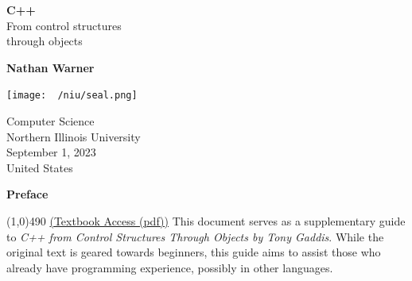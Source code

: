 \documentclass{report}
\title{\Huge{}}
\author{\huge{Nathan Warner}}
\date{\huge{}}
\begin{document}
        \begin{titlepage}
       \begin{center}
           \vspace*{1cm}
    
           \textbf{C++} \\
           From control structures  \\ through objects
    
           \vspace{0.5cm}
            
                
           \vspace{1.5cm}
    
           \textbf{Nathan Warner}
    
           \vfill
                
                
           \vspace{0.8cm}
         
           \texttt{[image: ~/niu/seal.png]}
                
           Computer Science \\
           Northern Illinois University\\
           September 1, 2023 \\
           United States\\
           
                
       \end{center}
    \end{titlepage}
    \tableofcontents
    \pagebreak \bigbreak \noindent
    \begin{center}
        \begin{Huge}
           \textbf{Preface} 
        \end{Huge}
    \end{center}
    \bigbreak \noindent 
    \line(1,0){490}
    \bigbreak \noindent 
    \href{https://github.com/JiaRuiShao/CPP/blob/master/Starting%20Out%20with%20C%2B%2B%20from%20Control%20Structures%20to%20Objects%208%20Tony%20Gaddis.pdf}{(Textbook Access (pdf))}
    \bigbreak \noindent 
    This document serves as a supplementary guide to \textit{C++ from Control Structures Through Objects by Tony Gaddis}. While the original text is geared towards beginners, this guide aims to assist those who already have programming experience, possibly in other languages.
\end{document}
